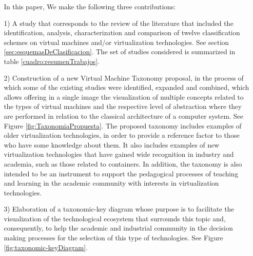 	
	
	
	

    
In this paper, We make the following three contributions:

    1) A study that corresponds to the review of the literature that included the identification, analysis, characterization and comparison of twelve classification schemes on virtual machines and/or virtualization technologies. See section \ref{sec:esquemasDeClasificacion}. The set of studies considered is summarized in table \ref{cuadro:resumenTrabajos}. 

    2) Construction of a new Virtual Machine Taxonomy proposal, in the process of which some of the existing studies were identified, expanded and combined, which allows offering in a single image the visualization of multiple concepts related to the types of virtual machines and the respective level of abstraction where they are performed in relation to the classical architecture of a computer system. See Figure \ref{fig:TaxonomiaPropuesta}.  The proposed taxonomy includes examples of older virtualization technologies, in order to provide a reference factor to those who have some knowledge about them. It also includes examples of new virtualization technologies that have gained wide recognition in industry and academia, such as those related to containers. In addition, the taxonomy is also intended to be an instrument to support the pedagogical processes of teaching and learning in the academic community with interests in virtualization technologies. 

    3) Elaboration of a taxonomic-key diagram whose purpose is to facilitate the visualization of the technological ecosystem that surrounds this topic and, consequently, to help the academic and industrial community in the decision making processes for the selection of this type of technologies. See Figure \ref{fig:taxonomic-keyDiagram}.